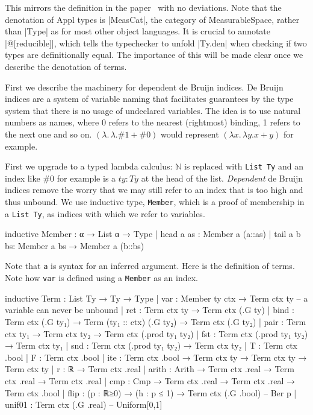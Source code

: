 This mirrors the definition in the paper~\citep{lilac} with no deviations. Note that the denotation of Appl types is \lean|MeasCat|, the category of
MeasurableSpace, rather than \lean|Type| as for most other object languages. It is crucial to annotate \lean|@[reducible]|, which tells the
typechecker to unfold \lean|Ty.den| when checking if two types are definitionally equal. The importance of this will be made clear once we describe
the denotation of terms.

First we describe the machinery for dependent de Bruijn indices. De Bruijn indices are a system of variable naming that facilitates guarantees
by the type system that there is no usage of undeclared variables. The idea is to use natural numbers as names, where 0 refers to the nearest (rightmost)
binding, 1 refers to the next one and so on. $(\lambda.\, \lambda. \#1 + \#0)$ would represent $(\lambda x.\, \lambda y. x + y)$ for example.

First we upgrade to a typed lambda calculus: $\mathbb{N}$ is replaced with \texttt{List Ty} and an index like $\#0$ for example is a $ty : Ty$ at the
head of the list. \emph{Dependent} de Bruijn indices remove the worry that we may still refer to an index that is too high and thus unbound.
We use inductive type, \texttt{Member}, which is a proof of membership in a \texttt{List Ty}, as indices with which we refer to variables.

\begin{leancode}
inductive Member : α → List α → Type
  | head {a as}  : Member a (a::as)
  | tail {a b bs}: Member a bs → Member a (b::bs)
\end{leancode}

Note that \texttt{{a}} is syntax for an inferred argument. Here is the definition of terms. Note how \texttt{var} is defined using a \texttt{Member} as
an index.

\begin{leancode}
inductive Term : List Ty → Ty → Type
  | var : Member ty ctx → Term ctx ty -- a variable can never be unbound
  | ret : Term ctx ty → Term ctx (.G ty)
  | bind : Term ctx (.G ty₁) → Term (ty₁ :: ctx) (.G ty₂) → Term ctx (.G ty₂)
  | pair : Term ctx ty₁ → Term ctx ty₂ → Term ctx (.prod ty₁ ty₂)
  | fst : Term ctx (.prod ty₁ ty₂) → Term ctx ty₁
  | snd : Term ctx (.prod ty₁ ty₂) → Term ctx ty₂
  | T : Term ctx .bool
  | F : Term ctx .bool
  | ite : Term ctx .bool → Term ctx ty → Term ctx ty → Term ctx ty
  | r : ℝ → Term ctx .real
  | arith : Arith → Term ctx .real → Term ctx .real → Term ctx .real
  | cmp : Cmp → Term ctx .real → Term ctx .real → Term ctx .bool
  | flip : (p : ℝ≥0) → (h : p ≤ 1) → Term ctx (.G .bool) -- Ber p
  | unif01 : Term ctx (.G .real) -- Uniform[0,1]
\end{leancode}

